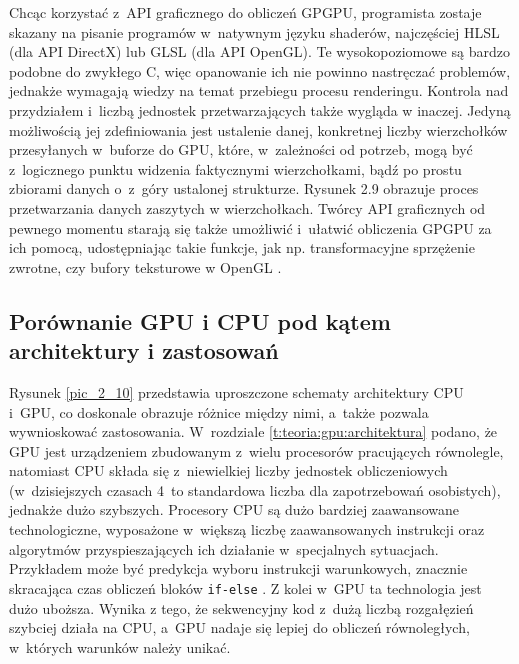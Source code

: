 		
		Chcąc korzystać z~API graficznego do obliczeń GPGPU, programista zostaje skazany na pisanie programów w~natywnym języku shaderów, najczęściej HLSL (dla API DirectX) lub GLSL (dla API OpenGL). Te wysokopoziomowe są bardzo podobne do zwykłego C, więc opanowanie ich nie powinno nastręczać problemów, jednakże wymagają wiedzy na temat przebiegu procesu renderingu. Kontrola nad przydziałem i~liczbą jednostek przetwarzających także wygląda w inaczej. Jedyną możliwością jej zdefiniowania jest ustalenie danej, konkretnej liczby wierzchołków przesyłanych w~buforze do GPU, które, w~zależności od potrzeb, mogą być z~logicznego punktu widzenia faktycznymi wierzchołkami, bądź po prostu zbiorami danych o~z~góry ustalonej strukturze. Rysunek 2.9 obrazuje proces przetwarzania danych zaszytych w wierzchołkach. Twórcy API graficznych od pewnego momentu starają się także umożliwić i~ułatwić obliczenia GPGPU za ich pomocą, udostępniając takie funkcje, jak np. transformacyjne sprzężenie zwrotne, czy bufory teksturowe w OpenGL \cite{receptury}. \newpage
		
		\subsection{Porównanie GPU i CPU pod kątem architektury i zastosowań}
		\label{t:teoria:gpu:porownanie}
		
		
		Rysunek \ref{pic_2_10} przedstawia uproszczone schematy architektury CPU i~GPU, co doskonale obrazuje różnice między nimi, a~także pozwala wywnioskować zastosowania. W~rozdziale \ref{t:teoria:gpu:architektura} podano, że GPU jest urządzeniem zbudowanym z~wielu procesorów pracujących równolegle, natomiast CPU składa się z~niewielkiej liczby jednostek obliczeniowych (w~dzisiejszych czasach 4~to standardowa liczba dla zapotrzebowań osobistych), jednakże dużo szybszych. Procesory CPU są dużo bardziej zaawansowane technologiczne, wyposażone w~większą liczbę zaawansowanych instrukcji oraz algorytmów przyspieszających ich działanie w~specjalnych sytuacjach. Przykładem może być predykcja wyboru instrukcji warunkowych, znacznie skracająca czas obliczeń bloków \texttt{if-else} \cite{branch_prediction_wiki}. Z kolei w~GPU ta technologia jest dużo uboższa. Wynika z tego, że sekwencyjny kod z~dużą liczbą rozgałęzień szybciej działa na CPU, a~GPU nadaje się lepiej do obliczeń równoległych, w~których warunków należy unikać. 
		\newpage
		
